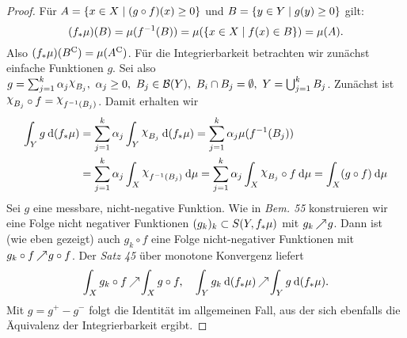 \documentclass[skript.tex]{subfiles}
\begin{document}
	\begin{proof}
		Für $A = \left\{x\in X \mid (g\circ f)(x) \geq 0\right\}$ und $B = \left\{y \in Y \mid g(y) \geq 0\right\}$ gilt:
		\[
			(f_*\mu) (B) = \mu(f^{-1}(B)) = \mu(\left\{x\in X \mid f(x) \in B\right\}) = \mu(A).
		\]
		Also $(f_* \mu)(B^\mathrm{C}) = \mu(A^\mathrm{C})$. Für die Integrierbarkeit betrachten wir zunächst einfache Funktionen $g$. Sei also $g=\sum_{j=1}^k \alpha_j \rchi_{B_j},\ \alpha_j \geq 0,\ B_j \in \mc{B}(Y),\ B_i \cap B_j = \es,\ Y = \bigcup_{j=1}^k B_j$.  Zunächst ist $\rchi_{B_j} \circ f = \rchi_{f^{-1} (B_j)}$. Damit erhalten wir
		\begin{align*}
			\int_Y g \md (f_* \mu) &= \sum_{j=1}^{k} \alpha_j \int_Y \rchi_{B_j} \md(f_* \mu) = \sum_{j=1}^k \alpha_j \mu(f^{-1}(B_j)) \\ 
			&= \sum_{j=1}^k \alpha_j \int_X \rchi_{f^{-1}(B_j)} \md \mu = \sum_{j=1}^k \alpha_j \int_X \rchi_{B_j} \circ f \md \mu = \int_X (g\circ f) \md \mu
		\end{align*}
		Sei $g$ eine messbare, nicht-negative Funktion. Wie in \textit{Bem. 55} konstruieren wir eine Folge nicht negativer Funktionen $(g_k)_k \subset S(Y, f_*\mu)$ mit $g_k \kern -1pt \nearrow \kern -2pt g$. Dann ist (wie eben gezeigt) auch $g_k \circ f$ eine Folge nicht-negativer Funktionen mit $g_k \circ f \kern -1pt \nearrow \kern -2pt g\circ f$. Der \textit{Satz 45} über monotone Konvergenz liefert
		\[
			\int_X g_k \circ f \kern -1pt \nearrow \kern -2pt \int_X g\circ f,\quad \int_Y g_k \: \mathrm{d} (f_* \mu) \kern -1pt \nearrow \kern -2pt \int_Y g \: \mathrm{d} (f_* \mu).
		\]
		Mit $g = g^+ - g^-$ folgt die Identität im allgemeinen Fall, aus der sich ebenfalls die Äquivalenz der Integrierbarkeit ergibt.
\end{proof}
	
	
\end{document}
